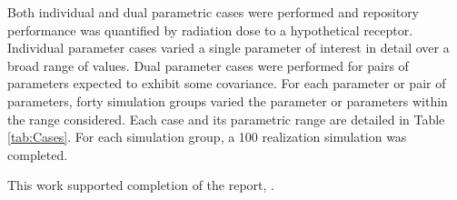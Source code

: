 \documentclass[letterpaper]{article}
\begin{document}
Both individual and dual parametric cases were performed and repository 
performance was quantified by radiation dose to a hypothetical receptor.
Individual parameter cases varied a single parameter of interest in 
detail over a broad range of values. Dual parameter cases were 
performed for pairs of parameters expected to exhibit some covariance. For 
each parameter or pair of parameters, forty simulation 
groups varied the parameter or parameters within the range considered. Each 
case and its parametric range are detailed in Table \ref{tab:Cases}. For each 
simulation group, a 100 realization simulation was completed. 


This work supported completion of the report, \cite{huff_fy12_2012}. 



\end{document}
